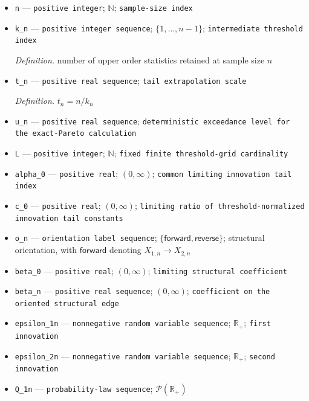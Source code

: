 \documentclass{article}
\begin{document}
\begin{itemize}
  \item \texttt{n} --- \texttt{positive integer}; \(\mathbb N\); \texttt{sample-\allowbreak{}size index}
  \item \texttt{k\_\allowbreak{}n} --- \texttt{positive integer sequence}; \(\{1,\ldots,n-1\}\); \texttt{intermediate threshold index}
  \par\smallskip\noindent\emph{Definition.} number of upper order statistics retained at sample size \(n\)
  \item \texttt{t\_\allowbreak{}n} --- \texttt{positive real sequence}; \texttt{tail extrapolation scale}
  \par\smallskip\noindent\emph{Definition.} \(t_n=n/k_n\)
  \item \texttt{u\_\allowbreak{}n} --- \texttt{positive real sequence}; \texttt{deterministic exceedance level for the exact-\allowbreak{}Pareto calculation}
  \item \texttt{L} --- \texttt{positive integer}; \(\mathbb N\); \texttt{fixed finite threshold-\allowbreak{}grid cardinality}
  \item \texttt{alpha\_\allowbreak{}0} --- \texttt{positive real}; \((0,\infty)\); \texttt{common limiting innovation tail index}
  \item \texttt{c\_\allowbreak{}0} --- \texttt{positive real}; \((0,\infty)\); \texttt{limiting ratio of threshold-\allowbreak{}normalized innovation tail constants}
  \item \texttt{o\_\allowbreak{}n} --- \texttt{orientation label sequence}; \(\{\mathsf{forward},\mathsf{reverse}\}\); structural orientation, with \(\mathsf{forward}\) denoting \(X_{1,n}\to X_{2,n}\)
  \item \texttt{beta\_\allowbreak{}0} --- \texttt{positive real}; \((0,\infty)\); \texttt{limiting structural coefficient}
  \item \texttt{beta\_\allowbreak{}n} --- \texttt{positive real sequence}; \((0,\infty)\); \texttt{coefficient on the oriented structural edge}
  \item \texttt{epsilon\_\allowbreak{}1n} --- \texttt{nonnegative random variable sequence}; \(\mathbb R_+\); \texttt{first innovation}
  \item \texttt{epsilon\_\allowbreak{}2n} --- \texttt{nonnegative random variable sequence}; \(\mathbb R_+\); \texttt{second innovation}
  \item \texttt{Q\_\allowbreak{}1n} --- \texttt{probability-\allowbreak{}law sequence}; \(\mathcal P(\mathbb R_+)\)

\end{itemize}
\end{document}
